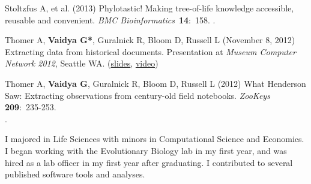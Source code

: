 \documentclass[12pt,letter]{article}
\begin{document}
\begin{publications}
\item Stoltzfus A, et al. (2013) Phylotastic! Making tree-of-life knowledge accessible, reusable and convenient. \textit{BMC Bioinformatics}~\textbf{14}:~158. .

\item Thomer A, \textbf{Vaidya G*}, Guralnick R, Bloom D, Russell L (November 8, 2012) Extracting data from historical documents. Presentation at \textit{Museum Computer Network 2012}, Seattle WA. (\href{http://www.slideshare.net/mrvaidya/extracting-data-from-historical-documents-crowdsourcing-annotations-on-wikisource}{slides}, \href{http://www.youtube.com/watch?v=_FHJgI1Aj0g}{video})

\item Thomer A, \textbf{Vaidya G}, Guralnick R, Bloom D, Russell L (2012) What Henderson Saw: Extracting observations from century-old field notebooks. \textit{ZooKeys} \textbf{209}:~235-253. \\ .

\end{publications}


I majored in Life Sciences with minors in Computational Science and Economics. I began working with the Evolutionary Biology lab in my first year, and was hired as a lab officer in my first year after graduating. I contributed to several published software tools and analyses.
\end{document}
